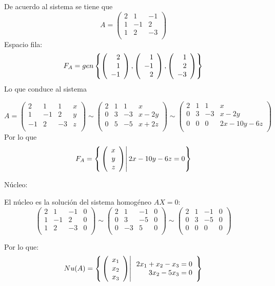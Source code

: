 \begin{enumerate}
\sol

De acuerdo al sistema se tiene que
\[A=
\left(
\begin{array}{rrr}
2&1&-1\\
1&-1&2\\
1&2&-3\\
\end{array}
\right)
\]
Espacio fila:
\[F_A=gen \left\{
\left( \begin{array}{r} 2\\ 1\\ -1 \end{array} \right) , \left( \begin{array}{r} 1\\ -1\\ 2 \end{array} \right) , \left( \begin{array}{r} 1\\ 2\\ -3 \end{array} \right) 
 \right\} \]
Lo que conduce al sistema

\[A=
\left(
\begin{array}{rrr|r}
2&1&1&x\\
1&-1&2&y\\
-1&2&-3&z\\
\end{array}
\right)
\sim
\left(
\begin{array}{rrr|r}
2&1&1&x\\
0&3&-3&x-2y\\
0&5&-5&x+2z\\
\end{array}
\right)
\sim
\left(
\begin{array}{rrr|r}
2&1&1&x\\
0&3&-3&x-2y\\
0&0&0&2x-10y-6z\\
\end{array}
\right)
\]
Por lo que
\[F_A=\left\{ \left. \left( \begin{array}{r} x\\ y\\ z \end{array} \right) \right| 2x-10y-6z=0 \right\}\]

N\'ucleo:

El n\'ucleo es la solución del sistema homog\'eneo $AX=0$:
\[
\left(
\begin{array}{rrr|r}
2&1&-1&0\\
1&-1&2&0\\
1&2&-3&0\\
\end{array}
\right)
\sim
\left(
\begin{array}{rrr|r}
2&1&-1&0\\
0&3&-5&0\\
0&-3&5&0\\
\end{array}
\right)
\sim
\left(
\begin{array}{rrr|r}
2&1&-1&0\\
0&3&-5&0\\
0&0&0&0\\
\end{array}
\right)
\]

Por lo que:
\[Nu(A)=\left\{ \left. \left( \begin{array}{r} x_1\\ x_2\\ x_3 \end{array} \right) \right| \begin{array}{r}
2x_1+x_2-x_3=0\\
3x_2-5x_3=0
\end{array} \right\}
\]


\end{enumerate}
